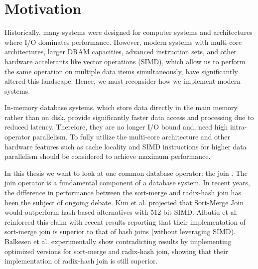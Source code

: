 \section{Motivation}
\label{sec:motivation}

Historically, many systems were designed for computer systems and architectures where I/O dominates
performance. However, modern systems with multi-core architectures, larger DRAM capacities,
advanced instruction sets, and other hardware accelerants like vector operations (SIMD), which allow us to
perform the same operation on multiple data items simultaneously, have significantly altered this
landscape. Hence, we must reconsider how we implement modern systems.

In-memory database systems, which store data directly in the main memory rather than on disk,
provide significantly faster data access and processing due to reduced latency.
Therefore, they are no longer I/O bound and, need high intra-operator
parallelism. To fully utilize the multi-core architecture and other hardware features such as cache
locality and SIMD instructions for higher data parallelism should be considered to achieve maximum
performance.

In this thesis we want to look at one common database operator: the join \cite{DBLP:conf/cloud/BlanasP13}.
The join operator is a fundamental component of a database system.
In recent years, the difference in performance between the sort-merge and radix-hash join has been
the subject of ongoing debate. Kim et al. \cite{10.14778/1687553.1687564} projected that Sort-Merge Join would outperform hash-based
alternatives with 512-bit SIMD. Albutiu et al. \cite{MPSM} reinforced this claim with recent results reporting that
their implementation of sort-merge join is superior to that of hash joins (without
leveraging SIMD). Balkesen et al. \cite{Balkesen} experimentally show contradicting results by implementing 
optimized versions for sort-merge and radix-hash join, showing that their implementation of
radix-hash join is still superior.


